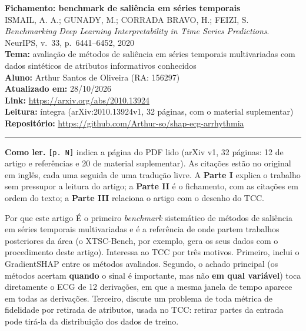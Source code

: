 \documentclass[11pt,a4paper]{article}
\begin{document}
\sloppy

\begin{center}
    {\LARGE \textbf{Fichamento: benchmark de saliência em séries temporais}} \\[0.35em]
    {\large ISMAIL, A. A.; GUNADY, M.; CORRADA BRAVO, H.; FEIZI, S. \textit{Benchmarking Deep Learning Interpretability in Time Series Predictions}. NeurIPS, v.~33, p.~6441--6452, 2020} \\[0.3em]
    \textbf{Tema:} avaliação de métodos de saliência em séries temporais multivariadas com dados sintéticos de atributos informativos conhecidos \\[0.2em]
    \textbf{Aluno:} Arthur Santos de Oliveira (RA: 156297) \\[0.2em]
    \textbf{Atualizado em:} 28/10/2026 \\[0.2em]
    \textbf{Link:} \url{https://arxiv.org/abs/2010.13924} \\[0.2em]
    \textbf{Leitura:} íntegra (arXiv:2010.13924v1, 32 páginas, com o material suplementar) \\[0.2em]
    \textbf{Repositório:} \url{https://github.com/Arthur-so/shap-ecg-arrhythmia}
\end{center}
\vspace{-0.5em}
\hrule
\vspace{0.8em}

\textbf{Como ler.} \texttt{[p. N]} indica a página do PDF lido (arXiv v1, 32 páginas: 12 de artigo e referências e 20 de material suplementar). As citações estão no original em inglês, cada uma seguida de uma tradução livre. A \textbf{Parte I} explica o trabalho sem pressupor a leitura do artigo; a \textbf{Parte II} é o fichamento, com as citações em ordem do texto; a \textbf{Parte III} relaciona o artigo com o desenho do TCC.

\begin{infobox}[note]{Por que este artigo}
É o primeiro \textit{benchmark} sistemático de métodos de saliência em séries temporais multivariadas e é a referência de onde partem trabalhos posteriores da área (o XTSC-Bench, por exemplo, gera os seus dados com o procedimento deste artigo). Interessa ao TCC por três motivos. Primeiro, inclui o GradientSHAP entre os métodos avaliados. Segundo, o achado principal (os métodos acertam \textbf{quando} o sinal é importante, mas não \textbf{em qual variável}) toca diretamente o ECG de 12 derivações, em que a mesma janela de tempo aparece em todas as derivações. Terceiro, discute um problema de toda métrica de fidelidade por retirada de atributos, usada no TCC: retirar partes da entrada pode tirá-la da distribuição dos dados de treino.
\end{infobox}
\end{document}
